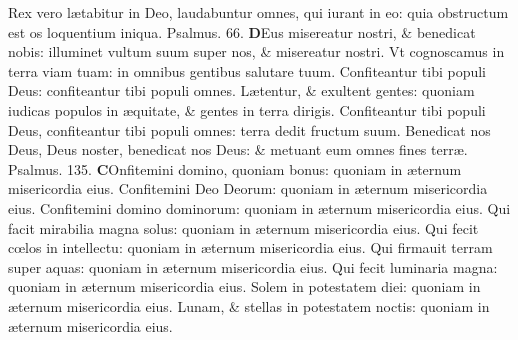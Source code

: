 \documentclass[a5paper,10pt]{book}
\def\ae{æ}
\def\oe{œ}
\begin{document}
\begin{multicols*}{2}
\newline \color{red} R\color{black}ex vero l\ae tabitur in Deo, laudabuntur omnes, qui iurant in eo: quia obstructum est os loquentium iniqua.
\newline \color{red} Psalmus. 66. \color{black}
\vspace{-.25em}
\lettrine[lines=2]{\bfseries \color{red} D}{}Eus misereatur nostri, \& benedicat nobis: illuminet vultum suum super nos, \& misereatur nostri.
\newline \color{red} V\color{black}t cognoscamus in terra viam tuam: in omnibus gentibus salutare tuum.
\newline \color{red} C\color{black}onfiteantur tibi populi Deus: confiteantur tibi populi omnes.
\newline \color{red} L\color{black}\ae tentur, \& exultent gentes: quoniam iudicas populos in \ae quitate, \& gentes in terra dirigis.
\newline \color{red} C\color{black}onfiteantur tibi populi Deus, confiteantur tibi populi omnes: terra dedit fructum suum.
\newline \color{red} B\color{black}enedicat nos Deus, Deus noster, benedicat nos Deus: \& metuant eum omnes fines terr\ae . \quad \color{red} Psalmus. 135. \color{black}
\vspace{-.25em}
\lettrine[lines=2]{\bfseries \color{red} C}{}Onfitemini domino, quoniam bonus: quoniam in \ae ternum misericordia eius.
\newline \color{red} C\color{black}onfitemini Deo Deorum: quoniam in \ae ternum misericordia eius.
\newline \color{red} C\color{black}onfitemini domino dominorum: quoniam in \ae ternum misericordia eius.
\newline \color{red} Q\color{black}ui facit mirabilia magna solus: quoniam in \ae ternum misericordia eius.
\newline \color{red} Q\color{black}ui fecit c\oe los in intellectu: quoniam in \ae ternum misericordia eius.
\newline \color{red} Q\color{black}ui firmauit terram super aquas: quoniam in \ae ternum misericordia eius.
\newline \color{red} Q\color{black}ui fecit luminaria magna: quoniam in \ae ternum misericordia eius.
\newline \color{red} S\color{black}olem in potestatem diei: quoniam in \ae ternum misericordia eius.
\newline \color{red} L\color{black}unam, \& stellas in potestatem noctis: quoniam in \ae ternum misericordia eius.

\end{multicols*}
\end{document}
